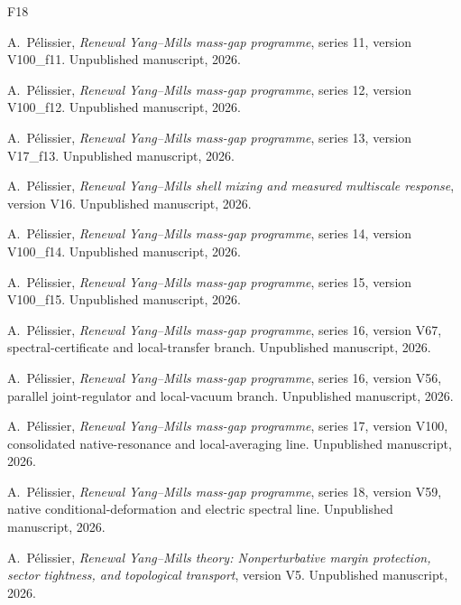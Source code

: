 \documentclass[11pt,oneside,openany]{book}
\theoremstyle{definition}
\theoremstyle{remark}
\begin{document}
\begin{thebibliography}{F18}

A.~P\'elissier, \emph{Renewal Yang--Mills mass-gap programme}, series 11, version V100\_f11. Unpublished manuscript, 2026.

A.~P\'elissier, \emph{Renewal Yang--Mills mass-gap programme}, series 12,
version V100\_f12. Unpublished manuscript, 2026.

A.~P\'elissier, \emph{Renewal Yang--Mills mass-gap programme}, series 13,
version V17\_f13. Unpublished manuscript, 2026.

A.~P\'elissier, \emph{Renewal Yang--Mills shell mixing and measured
multiscale response}, version V16. Unpublished manuscript, 2026.

A.~P\'elissier, \emph{Renewal Yang--Mills mass-gap programme}, series 14,
version V100\_f14. Unpublished manuscript, 2026.

A.~P\'elissier, \emph{Renewal Yang--Mills mass-gap programme}, series 15,
version V100\_f15. Unpublished manuscript, 2026.

A.~P\'elissier, \emph{Renewal Yang--Mills mass-gap programme}, series 16,
version V67, spectral-certificate and local-transfer branch.
Unpublished manuscript, 2026.

A.~P\'elissier, \emph{Renewal Yang--Mills mass-gap programme}, series 16,
version V56, parallel joint-regulator and local-vacuum branch.
Unpublished manuscript, 2026.

A.~P\'elissier, \emph{Renewal Yang--Mills mass-gap programme}, series 17,
version V100, consolidated native-resonance and local-averaging line.
Unpublished manuscript, 2026.

A.~P\'elissier, \emph{Renewal Yang--Mills mass-gap programme}, series 18,
version V59, native conditional-deformation and electric spectral line.
Unpublished manuscript, 2026.


A.~P\'elissier, \emph{Renewal Yang--Mills theory: Nonperturbative margin protection, sector tightness, and topological transport}, version V5. Unpublished manuscript, 2026.

\end{thebibliography}
\end{document}
